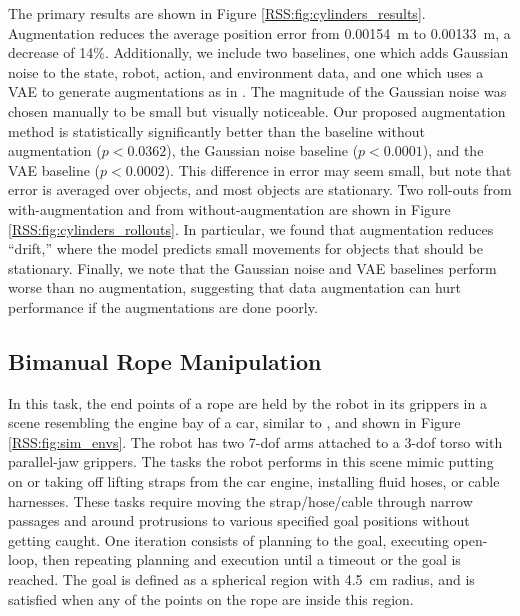 The primary results are shown in Figure \ref{RSS:fig:cylinders_results}. Augmentation reduces the average position error from \SI{0.00154}{\meter} to \SI{0.00133}{\meter}, a decrease of 14\%. Additionally, we include two baselines, one which adds Gaussian noise to the state, robot, action, and environment data, and one which uses a VAE to generate augmentations as in \cite{MaterialsAEOhno2020}. The magnitude of the Gaussian noise was chosen manually to be small but visually noticeable. Our proposed augmentation method is statistically significantly better than the baseline without augmentation ($p<0.0362$), the Gaussian noise baseline ($p<0.0001$), and the VAE baseline ($p<0.0002$). This difference in error may seem small, but note that error is averaged over objects, and most objects are stationary. Two roll-outs from with-augmentation and from without-augmentation are shown in Figure \ref{RSS:fig:cylinders_rollouts}. In particular, we found that augmentation reduces ``drift,'' where the model predicts small movements for objects that should be stationary. Finally, we note that the Gaussian noise and VAE baselines perform worse than no augmentation, suggesting that data augmentation can hurt performance if the augmentations are done poorly.

\subsection{Bimanual Rope Manipulation}

In this task, the end points of a rope are held by the robot in its grippers in a scene resembling the engine bay of a car, similar to \cite{UnreliableMitrano2021}, and shown in Figure \ref{RSS:fig:sim_envs}. The robot has two 7-dof arms attached to a 3-dof torso with parallel-jaw grippers. The tasks the robot performs in this scene mimic putting on or taking off lifting straps from the car engine, installing fluid hoses, or cable harnesses. These tasks require moving the strap/hose/cable through narrow passages and around protrusions to various specified goal positions without getting caught. One iteration consists of planning to the goal, executing open-loop, then repeating planning and execution until a timeout or the goal is reached. The goal is defined as a spherical region with \SI{4.5}{\centi\meter} radius, and is satisfied when any of the points on the rope are inside this region.


